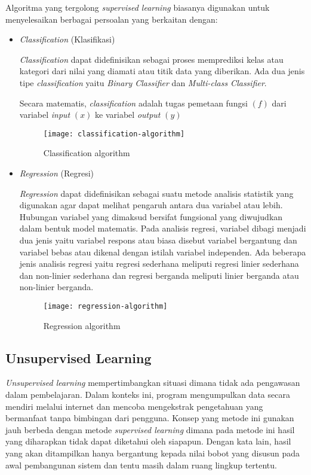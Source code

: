 Algoritma yang tergolong \emph{supervised learning} biasanya digunakan untuk menyelesaikan berbagai persoalan yang berkaitan dengan:
\begin{itemize}
    \item  \emph{Classification} (Klasifikasi)

          \emph{Classification} dapat didefinisikan sebagai proses memprediksi kelas atau kategori dari nilai yang diamati
          atau titik data yang diberikan. Ada dua jenis tipe \emph{classification} yaitu \emph{Binary Classifier} dan \emph{Multi-class Classifier}.

          Secara matematis, \emph{classification} adalah tugas pemetaan fungsi $(f)$ dari variabel \emph{input} $(x)$ ke variabel \emph{output} $(y)$
          \begin{figure}[h]
              \centering
              \texttt{[image: classification-algorithm]}
              \caption{Classification algorithm \cite{JavatpointClassificationAlgImage}}
          \end{figure}
    \item  \emph{Regression} (Regresi)

          \emph{Regression} dapat didefinisikan sebagai suatu metode analisis statistik yang digunakan agar dapat melihat pengaruh antara dua variabel atau lebih.
          Hubungan variabel yang dimaksud bersifat fungsional yang diwujudkan dalam bentuk model matematis.
          Pada analisis regresi, variabel dibagi menjadi dua jenis yaitu variabel respons atau biasa disebut variabel bergantung dan variabel bebas atau dikenal dengan istilah variabel independen.
          Ada beberapa jenis analisis regresi yaitu regresi sederhana meliputi regresi linier sederhana dan non-linier sederhana dan regresi berganda meliputi linier berganda atau non-linier berganda.
          \begin{figure}[h]
              \centering
              \texttt{[image: regression-algorithm]}
              \caption{Regression algorithm \cite{DavidFumoRegression}}
          \end{figure}
\end{itemize}
\subsection{Unsupervised Learning}
\emph{Unsupervised learning} mempertimbangkan situasi dimana tidak ada pengawasan dalam pembelajaran. Dalam konteks ini, program mengumpulkan data secara mendiri melalui internet dan mencoba mengekstrak pengetahuan yang bermanfaat tanpa bimbingan dari pengguna.
Konsep yang metode ini gunakan jauh berbeda dengan metode \emph{supervised learning} dimana pada metode ini hasil yang diharapkan tidak dapat diketahui oleh siapapun.
Dengan kata lain, hasil yang akan ditampilkan hanya bergantung kepada nilai bobot yang disusun pada awal pembangunan sistem dan tentu masih dalam ruang lingkup tertentu.

